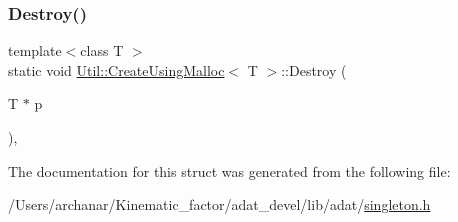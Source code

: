 \subsubsection{\texorpdfstring{Destroy()}{Destroy()}\hspace{0.1cm}{\footnotesize\ttfamily [2/2]}}
{\footnotesize\ttfamily template$<$class T $>$ \\
static void \mbox{\hyperlink{structUtil_1_1CreateUsingMalloc}{Util\+::\+Create\+Using\+Malloc}}$<$ T $>$\+::Destroy (\begin{DoxyParamCaption}\item[{T $\ast$}]{p }\end{DoxyParamCaption})\hspace{0.3cm}{\ttfamily [inline]}, {\ttfamily [static]}}



The documentation for this struct was generated from the following file\+:\begin{DoxyCompactItemize}
\item 
/\+Users/archanar/\+Kinematic\+\_\+factor/adat\+\_\+devel/lib/adat/\mbox{\hyperlink{lib_2adat_2singleton_8h}{singleton.\+h}}\end{DoxyCompactItemize}
